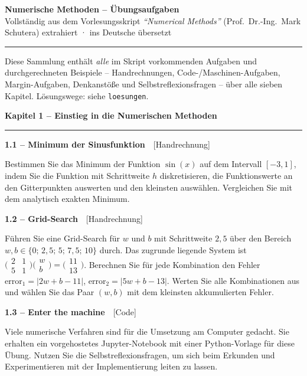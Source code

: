 \documentclass[a4paper,10pt]{article}
\newcommand{\kapitel}[1]{%
  \par\vspace{7pt}
  {\large\bfseries\color{accent} #1}\par
  \noindent\textcolor{accent}{\rule{\linewidth}{0.8pt}}\par\vspace{2pt}}
\newcommand{\aufg}[2]{%
  \par\vspace{3pt}
  {\bfseries\color{accent2} #1}~~{\footnotesize\color{accent2}[#2]}\par\vspace{1pt}}
\begin{document}
\begin{center}
  {\Large\bfseries\color{accent} Numerische Methoden -- Übungsaufgaben}\\[1pt]
  {\small Vollständig aus dem Vorlesungsskript \emph{``Numerical Methods''}
   (Prof.\ Dr.-Ing.\ Mark Schutera) extrahiert \;·\; ins Deutsche übersetzt}
\end{center}
\noindent\textcolor{rulecol}{\rule{\linewidth}{0.4pt}}

{\footnotesize Diese Sammlung enthält \emph{alle} im Skript vorkommenden Aufgaben
und durchgerechneten Beispiele -- Handrechnungen, Code-/Maschinen-Aufgaben,
Margin-Aufgaben, Denkanstöße und Selbstreflexionsfragen -- über alle sieben
Kapitel. Lösungswege: siehe \texttt{loesungen}.}

\kapitel{Kapitel 1 \;--\; Einstieg in die Numerischen Methoden}

\aufg{1.1 \;--\; Minimum der Sinusfunktion}{Handrechnung}
Bestimmen Sie das Minimum der Funktion $\sin(x)$ auf dem Intervall $[-3,1]$, indem
Sie die Funktion mit Schrittweite $h$ diskretisieren, die Funktionswerte an den
Gitterpunkten auswerten und den kleinsten auswählen. Vergleichen Sie mit dem
analytisch exakten Minimum.

\aufg{1.2 \;--\; Grid-Search}{Handrechnung}
Führen Sie eine Grid-Search für $w$ und $b$ mit Schrittweite $2{,}5$ über den
Bereich $w,b\in\{0;\,2{,}5;\,5;\,7{,}5;\,10\}$ durch. Das zugrunde liegende System
ist $\big(\begin{smallmatrix}2&1\\5&1\end{smallmatrix}\big)\big(\begin{smallmatrix}w\\b\end{smallmatrix}\big)=\big(\begin{smallmatrix}11\\13\end{smallmatrix}\big)$.
Berechnen Sie für jede Kombination den Fehler $\mathrm{error}_1=|2w+b-11|$,
$\mathrm{error}_2=|5w+b-13|$. Werten Sie alle Kombinationen aus und wählen Sie das
Paar $(w,b)$ mit dem kleinsten akkumulierten Fehler.

\aufg{1.3 \;--\; Enter the machine}{Code}
Viele numerische Verfahren sind für die Umsetzung am Computer gedacht. Sie erhalten
ein vorgehostetes Jupyter-Notebook mit einer Python-Vorlage für diese Übung. Nutzen
Sie die Selbstreflexionsfragen, um sich beim Erkunden und Experimentieren mit der
Implementierung leiten zu lassen.
\end{document}
